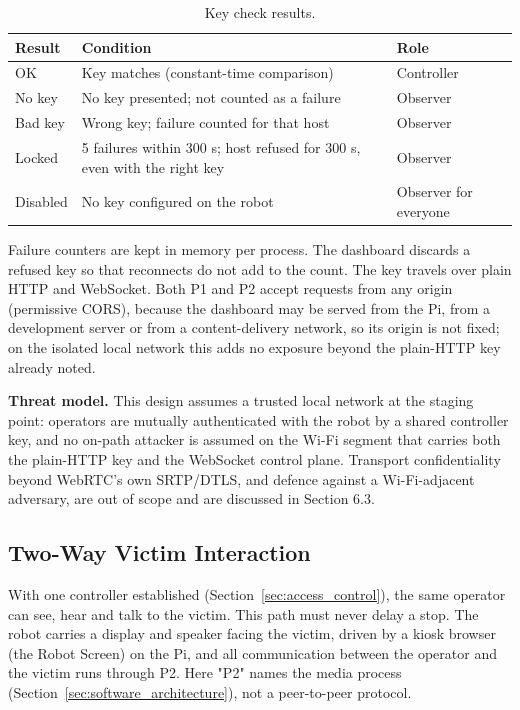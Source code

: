 \begin{table}[!t]
\centering
\caption{Key check results.}
\label{tab:11}
\begin{tabularx}{\linewidth}{l X l}
\toprule
Result & Condition & Role \\
\midrule
OK & Key matches (constant-time comparison) & Controller \\
No key & No key presented; not counted as a failure & Observer \\
Bad key & Wrong key; failure counted for that host & Observer \\
Locked & 5 failures within 300 s; host refused for 300 s, even with the right key & Observer \\
Disabled & No key configured on the robot & Observer for everyone \\
\bottomrule
\end{tabularx}
\end{table}

Failure counters are kept in memory per process. The dashboard discards a refused key so that reconnects do not add to the count. The key travels over plain HTTP and WebSocket. Both P1 and P2 accept requests from any origin (permissive CORS), because the dashboard may be served from the Pi, from a development server or from a content-delivery network, so its origin is not fixed; on the isolated local network this adds no exposure beyond the plain-HTTP key already noted.

\textbf{Threat model.} This design assumes a trusted local network at the staging point: operators are mutually authenticated with the robot by a shared controller key, and no on-path attacker is assumed on the Wi-Fi segment that carries both the plain-HTTP key and the WebSocket control plane. Transport confidentiality beyond WebRTC's own SRTP/DTLS, and defence against a Wi-Fi-adjacent adversary, are out of scope and are discussed in Section 6.3.

\subsection{Two-Way Victim Interaction}
\label{sec:victim_interaction}

With one controller established (Section~\ref{sec:access_control}), the same operator can see, hear and talk to the victim. This path must never delay a stop. The robot carries a display and speaker facing the victim, driven by a kiosk browser (the Robot Screen) on the Pi, and all communication between the operator and the victim runs through P2. Here "P2" names the media process (Section~\ref{sec:software_architecture}), not a peer-to-peer protocol.

